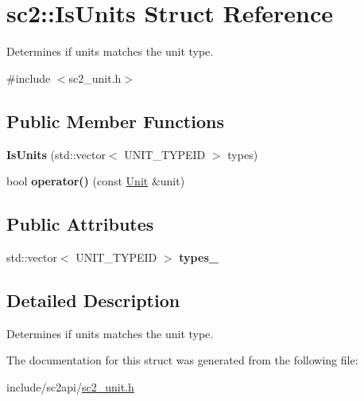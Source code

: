 \hypertarget{structsc2_1_1_is_units}{}\section{sc2\+:\+:Is\+Units Struct Reference}
\label{structsc2_1_1_is_units}


Determines if units matches the unit type.  




{\ttfamily \#include $<$sc2\+\_\+unit.\+h$>$}

\subsection*{Public Member Functions}
\begin{DoxyCompactItemize}
\item 
\mbox{\label{structsc2_1_1_is_units_a0571be5bc57424161ae96d4cdc079e69}} 
{\bfseries Is\+Units} (std\+::vector$<$ U\+N\+I\+T\+\_\+\+T\+Y\+P\+E\+ID $>$ types)
\item 
\mbox{\label{structsc2_1_1_is_units_ad3418d52747ad0d897a64fb073b867f2}} 
bool {\bfseries operator()} (const \hyperlink{classsc2_1_1_unit}{Unit} \&unit)
\end{DoxyCompactItemize}
\subsection*{Public Attributes}
\begin{DoxyCompactItemize}
\item 
\mbox{\label{structsc2_1_1_is_units_ae70fdef96b1484d9b8bd47861231c1d7}} 
std\+::vector$<$ U\+N\+I\+T\+\_\+\+T\+Y\+P\+E\+ID $>$ {\bfseries types\+\_\+}
\end{DoxyCompactItemize}


\subsection{Detailed Description}
Determines if units matches the unit type. 

The documentation for this struct was generated from the following file\+:\begin{DoxyCompactItemize}
\item 
include/sc2api/\hyperlink{sc2__unit_8h}{sc2\+\_\+unit.\+h}\end{DoxyCompactItemize}
